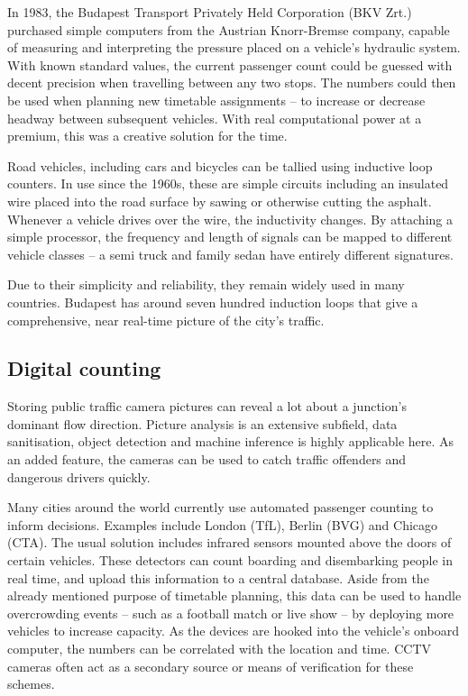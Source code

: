 In 1983, the Budapest Transport Privately Held Corporation (BKV Zrt.) purchased simple computers from the Austrian Knorr-Bremse company, capable of measuring and interpreting the pressure placed on a vehicle's hydraulic system.\cite{ik260_article} With known standard values, the current passenger count could be guessed with decent precision when travelling between any two stops. The numbers could then be used when planning new timetable assignments -- to increase or decrease headway between subsequent vehicles. With real computational power at a premium, this was a creative solution for the time.

Road vehicles, including cars and bicycles can be tallied using inductive loop counters.\cite{fhwaLoop} In use since the 1960s, these are simple circuits including an insulated wire placed into the road surface by sawing or otherwise cutting the asphalt. Whenever a vehicle drives over the wire, the inductivity changes. By attaching a simple processor, the frequency and length of signals can be mapped to different vehicle classes -- a semi truck and family sedan have entirely different signatures. 

Due to their simplicity and reliability, they remain widely used in many countries. Budapest has around seven hundred induction loops that give a comprehensive, near real-time picture of the city's traffic.\cite{BkkDataCollection}

\subsection{Digital counting}
Storing public traffic camera pictures can reveal a lot about a junction's dominant flow direction. Picture analysis is an extensive subfield, data sanitisation, object detection and machine inference is highly applicable here. As an added feature, the cameras can be used to catch traffic offenders and dangerous drivers quickly.

Many cities around the world currently use automated passenger counting to inform decisions. Examples include London (TfL), Berlin (BVG) and Chicago (CTA). The usual solution includes infrared sensors mounted above the doors of certain vehicles. These detectors can count boarding and disembarking people in real time, and upload this information to a central database. Aside from the already mentioned purpose of timetable planning, this data can be used to handle overcrowding events -- such as a football match or live show -- by deploying more vehicles to increase capacity. As the devices are hooked into the vehicle's onboard computer, the numbers can be correlated with the location and time. CCTV cameras often act as a secondary source or means of verification for these schemes.

